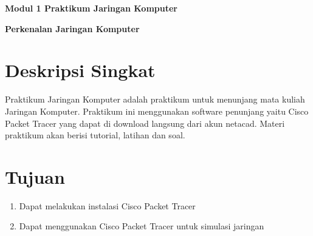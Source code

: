 \documentclass{article}
\begin{document}
    \begin{center}  
        \textbf{Modul 1 Praktikum Jaringan Komputer}

        \textbf{Perkenalan Jaringan Komputer}
    \end{center}

    \section*{Deskripsi Singkat}
    Praktikum Jaringan Komputer adalah praktikum untuk menunjang mata kuliah Jaringan Komputer.
    Praktikum ini menggunakan software penunjang yaitu Cisco Packet Tracer yang dapat di download langsung dari akun netacad.
    Materi praktikum akan berisi tutorial, latihan dan soal.
   

    \section*{Tujuan}
    \begin{enumerate}
        \item Dapat melakukan instalasi Cisco Packet Tracer
        \item Dapat menggunakan Cisco Packet Tracer untuk simulasi jaringan
    \end{enumerate}
\end{document}
